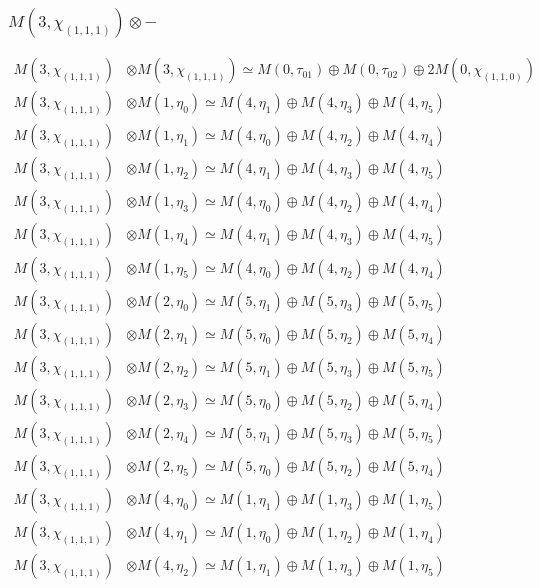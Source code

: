 \subsubsection{$ M(3,\chi_{(1,1,1)})\otimes -$}
\begin{align*}
M(3,\chi_{(1,1,1)}) &\otimes M(3,\chi_{(1,1,1)}) \simeq M(0,\tau_{01}) \oplus M(0,\tau_{02}) \oplus 2 M(0,\chi_{(1,1,0)}) \\
M(3,\chi_{(1,1,1)}) &\otimes M(1,\eta_{0}) \simeq M(4,\eta_{1}) \oplus M(4,\eta_{3}) \oplus M(4,\eta_{5}) \\
M(3,\chi_{(1,1,1)}) &\otimes M(1,\eta_{1}) \simeq M(4,\eta_{0}) \oplus M(4,\eta_{2}) \oplus M(4,\eta_{4}) \\
M(3,\chi_{(1,1,1)}) &\otimes M(1,\eta_{2}) \simeq M(4,\eta_{1}) \oplus M(4,\eta_{3}) \oplus M(4,\eta_{5}) \\
M(3,\chi_{(1,1,1)}) &\otimes M(1,\eta_{3}) \simeq M(4,\eta_{0}) \oplus M(4,\eta_{2}) \oplus M(4,\eta_{4}) \\
M(3,\chi_{(1,1,1)}) &\otimes M(1,\eta_{4}) \simeq M(4,\eta_{1}) \oplus M(4,\eta_{3}) \oplus M(4,\eta_{5}) \\
M(3,\chi_{(1,1,1)}) &\otimes M(1,\eta_{5}) \simeq M(4,\eta_{0}) \oplus M(4,\eta_{2}) \oplus M(4,\eta_{4}) \\
M(3,\chi_{(1,1,1)}) &\otimes M(2,\eta_{0}) \simeq M(5,\eta_{1}) \oplus M(5,\eta_{3}) \oplus M(5,\eta_{5}) \\
M(3,\chi_{(1,1,1)}) &\otimes M(2,\eta_{1}) \simeq M(5,\eta_{0}) \oplus M(5,\eta_{2}) \oplus M(5,\eta_{4}) \\
M(3,\chi_{(1,1,1)}) &\otimes M(2,\eta_{2}) \simeq M(5,\eta_{1}) \oplus M(5,\eta_{3}) \oplus M(5,\eta_{5}) \\
M(3,\chi_{(1,1,1)}) &\otimes M(2,\eta_{3}) \simeq M(5,\eta_{0}) \oplus M(5,\eta_{2}) \oplus M(5,\eta_{4}) \\
M(3,\chi_{(1,1,1)}) &\otimes M(2,\eta_{4}) \simeq M(5,\eta_{1}) \oplus M(5,\eta_{3}) \oplus M(5,\eta_{5}) \\
M(3,\chi_{(1,1,1)}) &\otimes M(2,\eta_{5}) \simeq M(5,\eta_{0}) \oplus M(5,\eta_{2}) \oplus M(5,\eta_{4}) \\
M(3,\chi_{(1,1,1)}) &\otimes M(4,\eta_{0}) \simeq M(1,\eta_{1}) \oplus M(1,\eta_{3}) \oplus M(1,\eta_{5}) \\
M(3,\chi_{(1,1,1)}) &\otimes M(4,\eta_{1}) \simeq M(1,\eta_{0}) \oplus M(1,\eta_{2}) \oplus M(1,\eta_{4}) \\
M(3,\chi_{(1,1,1)}) &\otimes M(4,\eta_{2}) \simeq M(1,\eta_{1}) \oplus M(1,\eta_{3}) \oplus M(1,\eta_{5}) \\

\end{align*}
